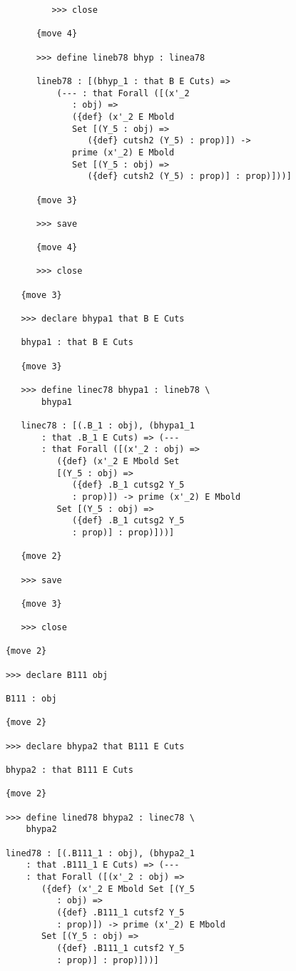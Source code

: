 \documentclass[12pt]{article}
\begin{document}
\begin{verbatim}
               >>> close

            {move 4}

            >>> define lineb78 bhyp : linea78

            lineb78 : [(bhyp_1 : that B E Cuts) => 
                (--- : that Forall ([(x'_2 
                   : obj) => 
                   ({def} (x'_2 E Mbold 
                   Set [(Y_5 : obj) => 
                      ({def} cutsh2 (Y_5) : prop)]) -> 
                   prime (x'_2) E Mbold 
                   Set [(Y_5 : obj) => 
                      ({def} cutsh2 (Y_5) : prop)] : prop)]))]

            {move 3}

            >>> save

            {move 4}

            >>> close

         {move 3}

         >>> declare bhypa1 that B E Cuts

         bhypa1 : that B E Cuts

         {move 3}

         >>> define linec78 bhypa1 : lineb78 \
             bhypa1

         linec78 : [(.B_1 : obj), (bhypa1_1 
             : that .B_1 E Cuts) => (--- 
             : that Forall ([(x'_2 : obj) => 
                ({def} (x'_2 E Mbold Set 
                [(Y_5 : obj) => 
                   ({def} .B_1 cutsg2 Y_5 
                   : prop)]) -> prime (x'_2) E Mbold 
                Set [(Y_5 : obj) => 
                   ({def} .B_1 cutsg2 Y_5 
                   : prop)] : prop)]))]

         {move 2}

         >>> save

         {move 3}

         >>> close

      {move 2}

      >>> declare B111 obj

      B111 : obj

      {move 2}

      >>> declare bhypa2 that B111 E Cuts

      bhypa2 : that B111 E Cuts

      {move 2}

      >>> define lined78 bhypa2 : linec78 \
          bhypa2

      lined78 : [(.B111_1 : obj), (bhypa2_1 
          : that .B111_1 E Cuts) => (--- 
          : that Forall ([(x'_2 : obj) => 
             ({def} (x'_2 E Mbold Set [(Y_5 
                : obj) => 
                ({def} .B111_1 cutsf2 Y_5 
                : prop)]) -> prime (x'_2) E Mbold 
             Set [(Y_5 : obj) => 
                ({def} .B111_1 cutsf2 Y_5 
                : prop)] : prop)]))]


\end{verbatim}
\end{document}
